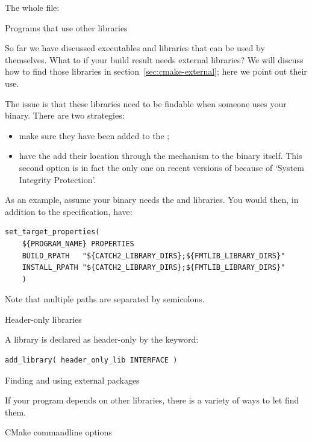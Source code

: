 The whole file:
%


\newpage
{} {Programs that use other libraries}

So far we have discussed executables and libraries that can be used by themselves.
What to if your build result needs external libraries?
We will discuss how to find those libraries in section~\ref{sec:cmake-external};
here we point out their use.

The issue is that these libraries need to be findable
when someone uses your binary. There are two strategies:
\begin{itemize}
\item make sure they have been added to the ;
\item have the  add their location through the 
  mechanism to the binary itself.
  This second option is in fact the only one on recent versions of
   because of `System Integrity Protection'.
\end{itemize}

As an example, assume your binary needs the 
and  libraries.
You would then,
in addition to the  specification,
have:
\begin{lstlisting}
set_target_properties(
	${PROGRAM_NAME} PROPERTIES
	BUILD_RPATH   "${CATCH2_LIBRARY_DIRS};${FMTLIB_LIBRARY_DIRS}"
	INSTALL_RPATH "${CATCH2_LIBRARY_DIRS};${FMTLIB_LIBRARY_DIRS}"
    )
\end{lstlisting}
Note that multiple paths are separated by semicolons.

 {Header-only libraries}

A library is declared as header-only by the  keyword:
\begin{lstlisting}
add_library( header_only_lib INTERFACE )
\end{lstlisting}


 {Finding and using external packages}
\label{sec:cmake-external}

If your program depends on other libraries, there is a variety of ways
to let  find them.

 {CMake commandline options}


